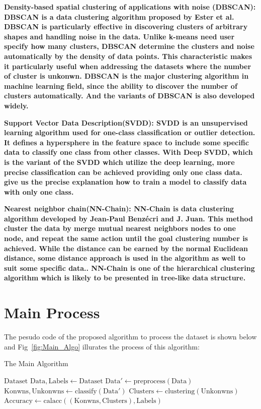 \documentclass[twocolumn,10pt]{article}
\begin{document}
\bf{Density-based spatial clustering of applications with noise (DBSCAN)}: \rm{DBSCAN} is a data clustering 
algorithm proposed by Ester et al. \cite{10.5555/3001460.3001507} DBSCAN is particularly effective in 
discovering clusters of arbitrary shapes and handling noise in the data. Unlike k-means need user specify 
how many clusters, DBSCAN determine the clusters and noise automatically by the density of data points. 
This characteristic makes it particularly useful when addressing the datasets where the number of cluster 
is unkonwn. DBSCAN is the major clustering algorithm in machine learning field, since the ability to 
discover the number of clusters automatically. And the variants of DBSCAN \cite{6814687} is also developed widely. 

\bf{Support Vector Data Description(SVDD)}:  \rm{SVDD} is an unsupervised learning algorithm used for one-class classification or outlier detection. It defines a hypersphere in the feature space to include some specific data to classify one class from other classes. With Deep SVDD, which is the variant of the SVDD which utilize the deep learning, more precise classification can be achieved providing only one class data.\cite{perera2021oneclass} give us the precise explanation how to train a model to classify data with only one class.

\bf{Nearest neighbor chain(NN-Chain)}: \rm{NN-Chain} is data clustering algorithm developed by Jean-Paul Benzécri and J. Juan\cite{Benzécri1982}. This method cluster the data by merge mutual nearest neighbors nodes to one node, and repeat the same action until the goal clustering number is achieved. While the distance can be earned by the normal Euclidean distance, some distance approach is used in the algorithm as well to suit some specific data.\cite{10.1093/comjnl/26.4.354}\cite{müllner2011modern}. NN-Chain is one of the hierarchical clustering algorithm which is likely to be presented in tree-like data structure.
\section{Main Process}
  The pesudo code of the proposed algorithm to process the dataset is shown below and Fig~\ref{fig:Main_Algo} 
  illurates the process of this algorithm:
  \begin{algorithm}
    \caption{The Main Algorithm}\label{alg:main}
    \begin{algorithmic}[1]
      \Require $\text{Dataset}$
      \State $\text{Data}, \text{Labels} \gets \text{Dataset}$
      \State $\text{Data}' \gets \text{preprocess}(\text{Data})$
      \State $\text{Konwns}, \text{Unkonwns} \gets \text{classify}(\text{Data}')$
      \State $\text{Clusters} \gets \text{clustering}(\text{Unkonwns})$
      \State $\text{Accuracy} \gets \text{calacc}((\text{Konwns}, \text{Clusters}), \text{Labels})$
    \end{algorithmic}
  \end{algorithm}
\end{document}
